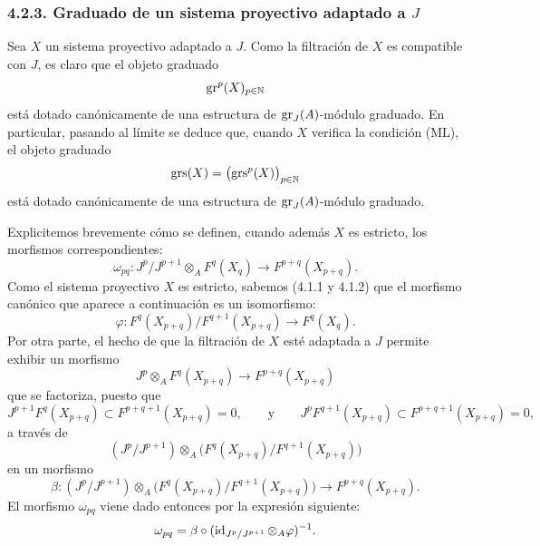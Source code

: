 \subsubsection*{4.2.3. Graduado de un sistema proyectivo adaptado a \(J\)}
Sea \(X\) un sistema proyectivo adaptado a \(J\). Como la filtración de \(X\) es compatible con \(J\), es claro que el objeto graduado
\[
\operatorname{gr}^p(X)_{p\in\mathbb N}
\]
está dotado canónicamente de una estructura de \(\operatorname{gr}_J(A)\)-módulo graduado. En particular, pasando al límite se deduce que, cuando \(X\) verifica la condición (ML), el objeto graduado
\[
\operatorname{grs}(X)=\bigl(\operatorname{grs}^p(X)\bigr)_{p\in\mathbb N}
\]
está dotado canónicamente de una estructura de \(\operatorname{gr}_J(A)\)-módulo graduado.

Explicitemos brevemente cómo se definen, cuando además \(X\) es estricto, los morfismos correspondientes:
\[
\omega_{pq}: J^p/J^{p+1}\otimes_A F^q(X_q)\longrightarrow F^{p+q}(X_{p+q}).
\]
Como el sistema proyectivo \(X\) es estricto, sabemos (4.1.1 y 4.1.2) que el morfismo canónico que aparece a continuación es un isomorfismo:
\[
\varphi:F^q(X_{p+q})/F^{q+1}(X_{p+q})\longrightarrow F^q(X_q).
\]
Por otra parte, el hecho de que la filtración de \(X\) esté adaptada a \(J\) permite exhibir un morfismo
\[
J^p\otimes_A F^q(X_{p+q})\longrightarrow F^{p+q}(X_{p+q})
\]
que se factoriza, puesto que
\[
J^{p+1}F^q(X_{p+q})\subset F^{p+q+1}(X_{p+q})=0,\qquad\text{y}\qquad
J^pF^{q+1}(X_{p+q})\subset F^{p+q+1}(X_{p+q})=0,
\]
a través de
\[
(J^p/J^{p+1})\otimes_A
\bigl(F^q(X_{p+q})/F^{q+1}(X_{p+q})\bigr)
\]
en un morfismo
\[
\beta:(J^p/J^{p+1})\otimes_A
\bigl(F^q(X_{p+q})/F^{q+1}(X_{p+q})\bigr)
\longrightarrow F^{p+q}(X_{p+q}).
\]
El morfismo \(\omega_{pq}\) viene dado entonces por la expresión siguiente:
\[
\omega_{pq}=\beta\circ(\operatorname{id}_{J^p/J^{p+1}}\otimes_A\varphi)^{-1}.
\]
